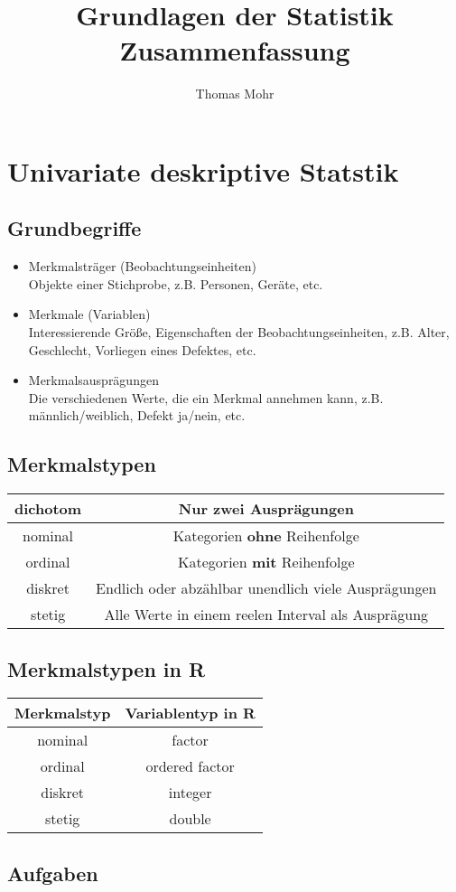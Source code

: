 \documentclass{scrartcl}
\title{Grundlagen der Statistik \\ Zusammenfassung}
\author{Thomas Mohr}
\date{}
\begin{document}
\maketitle
\pagebreak
\tableofcontents{}
\pagebreak

\section{Univariate deskriptive Statstik}

\subsection{Grundbegriffe}

\begin{itemize}
	\item Merkmalsträger (Beobachtungseinheiten) \\
	Objekte einer Stichprobe, z.B. Personen, Geräte, etc.
	\item Merkmale (Variablen) \\
	Interessierende Größe, Eigenschaften der Beobachtungseinheiten, z.B. Alter, Geschlecht, Vorliegen eines Defektes, etc.
	\item Merkmalsausprägungen \\
	Die verschiedenen Werte, die ein Merkmal annehmen kann, z.B. männlich/weiblich, Defekt ja/nein, etc.
\end{itemize}

\subsection{Merkmalstypen}

\begin{tabular}{|c|c|}
\hline 
dichotom & Nur zwei Ausprägungen \\ 
\hline 
nominal & Kategorien \textbf{ohne} Reihenfolge \\ 
\hline 
ordinal & Kategorien \textbf{mit} Reihenfolge \\ 
\hline 
diskret & Endlich oder abzählbar unendlich viele Ausprägungen \\ 
\hline 
stetig & Alle Werte in einem reelen Interval als Ausprägung \\ 
\hline 
\end{tabular} 

\subsection{Merkmalstypen in R}

\begin{tabular}{|c|c|}
\hline 
\textbf{Merkmalstyp} & \textbf{Variablentyp in R} \\ 
\hline 
nominal & factor \\ 
\hline 
ordinal & ordered factor \\ 
\hline 
diskret & integer \\ 
\hline 
stetig & double \\ 
\hline 
\end{tabular} 

\subsection{Aufgaben}
\end{document}
